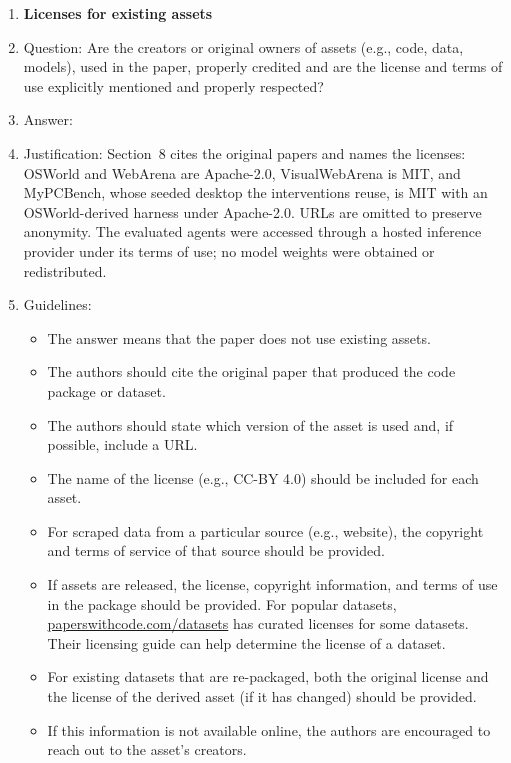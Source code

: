 \begin{enumerate}
\item {\bf Licenses for existing assets}
    \item[] Question: Are the creators or original owners of assets (e.g., code, data, models), used in the paper, properly credited and are the license and terms of use explicitly mentioned and properly respected?
    \item[] Answer: \answerYes{}
    \item[] Justification: Section~8 cites the original papers and names the licenses: OSWorld and WebArena are Apache-2.0, VisualWebArena is MIT, and MyPCBench, whose seeded desktop the interventions reuse, is MIT with an OSWorld-derived harness under Apache-2.0. URLs are omitted to preserve anonymity. The evaluated agents were accessed through a hosted inference provider under its terms of use; no model weights were obtained or redistributed.
    \item[] Guidelines:
    \begin{itemize}
        \item The answer \answerNA{} means that the paper does not use existing assets.
        \item The authors should cite the original paper that produced the code package or dataset.
        \item The authors should state which version of the asset is used and, if possible, include a URL.
        \item The name of the license (e.g., CC-BY 4.0) should be included for each asset.
        \item For scraped data from a particular source (e.g., website), the copyright and terms of service of that source should be provided.
        \item If assets are released, the license, copyright information, and terms of use in the package should be provided. For popular datasets, \url{paperswithcode.com/datasets} has curated licenses for some datasets. Their licensing guide can help determine the license of a dataset.
        \item For existing datasets that are re-packaged, both the original license and the license of the derived asset (if it has changed) should be provided.
        \item If this information is not available online, the authors are encouraged to reach out to the asset's creators.
    \end{itemize}


\end{enumerate}
